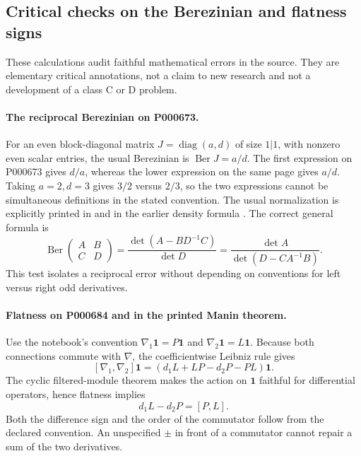 \subsection{Critical checks on the Berezinian and flatness signs}

These calculations audit faithful mathematical errors in the source. They are
elementary critical annotations, not a claim to new research and not a development
of a class C or D problem.

\paragraph{The reciprocal Berezinian on P000673.}\oursComputed{}
For an even block-diagonal matrix \(J=\operatorname{diag}(a,d)\) of size
\(1|1\), with nonzero even scalar entries, the usual Berezinian is
\(\operatorname{Ber}J=a/d\). The first expression on P000673 gives \(d/a\),
whereas the lower expression on the same page gives \(a/d\).
Taking \(a=2,d=3\) gives \(3/2\) versus \(2/3\), so the two expressions
cannot be simultaneous definitions in the stated convention.
The usual normalization is explicitly printed in
\citet[\S1]{bernsteinleites1977integral} and in the earlier density formula
\citep[formula~(3)]{berezinleites1975supermanifolds}.
The correct general formula is
\[
 \operatorname{Ber}\begin{pmatrix}A&B\\C&D\end{pmatrix}
 =\frac{\det(A-BD^{-1}C)}{\det D}
 =\frac{\det A}{\det(D-CA^{-1}B)}.
\]
This test isolates a reciprocal error without depending on conventions for
left versus right odd derivatives.

\paragraph{Flatness on P000684 and in the printed Manin theorem.}\ours{}
Use the notebook's convention
\(\nabla_1\mathbf1=P\mathbf1\) and
\(\nabla_2\mathbf1=L\mathbf1\).
Because both connections commute with \(\nabla\), the coefficientwise
Leibniz rule gives
\[
 [\nabla_1,\nabla_2]\mathbf1
 = (d_1L+LP-d_2P-PL)\mathbf1.
\]
The cyclic filtered-module theorem makes the action on \(\mathbf1\)
faithful for differential operators, hence flatness implies
\[
 d_1L-d_2P=[P,L].
\]
Both the difference sign and the order of the commutator follow from the
declared convention. An unspecified \(\pm\) in front of a commutator cannot
repair a sum of the two derivatives.

